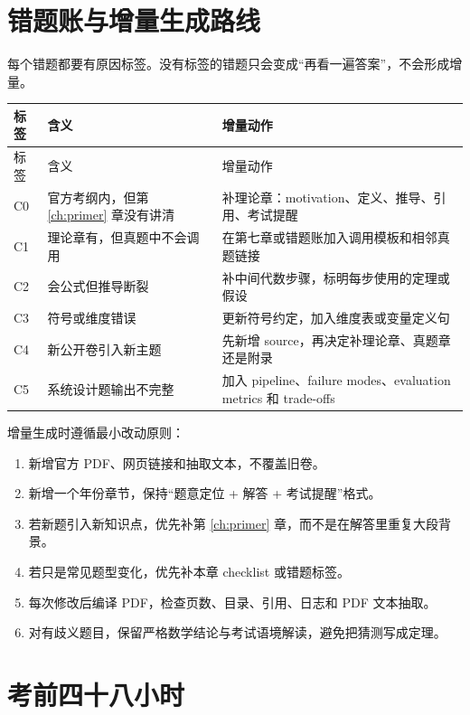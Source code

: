 \section{错题账与增量生成路线}

每个错题都要有原因标签。没有标签的错题只会变成“再看一遍答案”，不会形成增量。

\begingroup
\small
\begin{longtable}{L{0.16\textwidth}L{0.36\textwidth}L{0.38\textwidth}}
\toprule
标签 & 含义 & 增量动作 \\
\midrule
\endfirsthead
\toprule
标签 & 含义 & 增量动作 \\
\midrule
\endhead
C0 & 官方考纲内，但第 \ref{ch:primer} 章没有讲清 & 补理论章：motivation、定义、推导、引用、考试提醒 \\
C1 & 理论章有，但真题中不会调用 & 在第七章或错题账加入调用模板和相邻真题链接 \\
C2 & 会公式但推导断裂 & 补中间代数步骤，标明每步使用的定理或假设 \\
C3 & 符号或维度错误 & 更新符号约定，加入维度表或变量定义句 \\
C4 & 新公开卷引入新主题 & 先新增 source，再决定补理论章、真题章还是附录 \\
C5 & 系统设计题输出不完整 & 加入 pipeline、failure modes、evaluation metrics 和 trade-offs \\
\bottomrule
\end{longtable}
\endgroup

增量生成时遵循最小改动原则：

\begin{enumerate}
  \item 新增官方 PDF、网页链接和抽取文本，不覆盖旧卷。
  \item 新增一个年份章节，保持“题意定位 + 解答 + 考试提醒”格式。
  \item 若新题引入新知识点，优先补第 \ref{ch:primer} 章，而不是在解答里重复大段背景。
  \item 若只是常见题型变化，优先补本章 checklist 或错题标签。
  \item 每次修改后编译 PDF，检查页数、目录、引用、日志和 PDF 文本抽取。
  \item 对有歧义题目，保留严格数学结论与考试语境解读，避免把猜测写成定理。
\end{enumerate}

\section{考前四十八小时}

